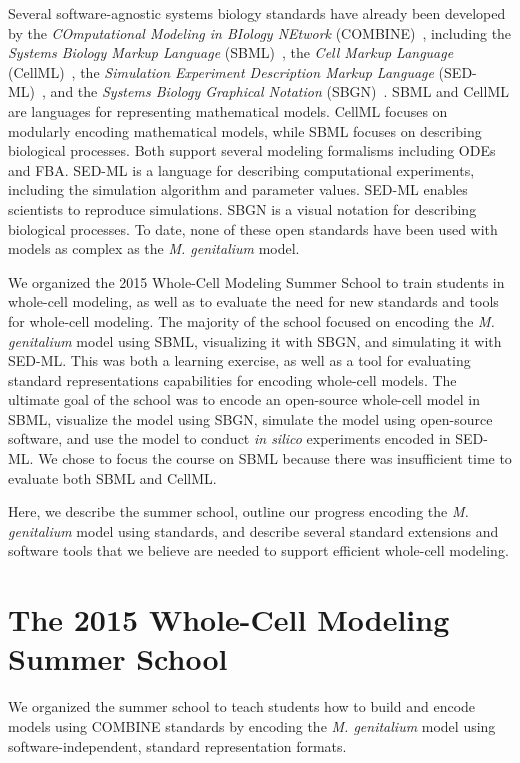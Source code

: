 \documentclass[journal,transmag]{IEEEtran}
\begin{document}
Several software-agnostic systems biology standards have already been developed by the \emph{COmputational Modeling in BIology NEtwork} (COMBINE)~\cite{le2011meeting}, including the \emph{Systems Biology Markup Language} (SBML)~\cite{hucka2003}, the \emph{Cell Markup Language} (CellML)~\cite{hedley_2001b}, the \emph{Simulation Experiment Description Markup Language} (SED-ML)~\cite{sedml2011}, and the \emph{Systems Biology Graphical Notation} (SBGN)~\cite{LeNovereHMMSS09}. SBML and CellML are languages for representing mathematical models. CellML focuses on modularly encoding mathematical models, while SBML focuses on describing biological processes. Both support several modeling formalisms including ODEs and FBA. SED-ML is a language for describing computational experiments, including the simulation algorithm and parameter values. SED-ML enables scientists to reproduce simulations. SBGN is a visual notation for describing biological processes. To date, none of these open standards have been used with models as complex as the \textit{M. genitalium} model.

We organized the 2015 Whole-Cell Modeling Summer School to train students in whole-cell modeling, as well as to evaluate the need for new standards and tools for whole-cell modeling. The majority of the school focused on encoding the \textit{M. genitalium} model using SBML, visualizing it with SBGN, and simulating it with SED-ML. This was both a learning exercise, as well as a tool for evaluating standard representations capabilities for encoding whole-cell models. The ultimate goal of the school was to encode an open-source whole-cell model in SBML, visualize the model using SBGN, simulate the model using open-source software, and use the model to conduct \textit{in silico} experiments encoded in SED-ML. We chose to focus the course on SBML because there was insufficient time to evaluate both SBML and CellML.

Here, we describe the summer school, outline our progress encoding the \textit{M. genitalium} model using standards, and describe several standard extensions and software tools that we believe are needed to support efficient whole-cell modeling.

\section{The 2015 Whole-Cell Modeling Summer School}
We organized the summer school to teach students how to build and encode models using COMBINE standards by encoding the \textit{M. genitalium} model using software-independent, standard representation formats.
\end{document}
